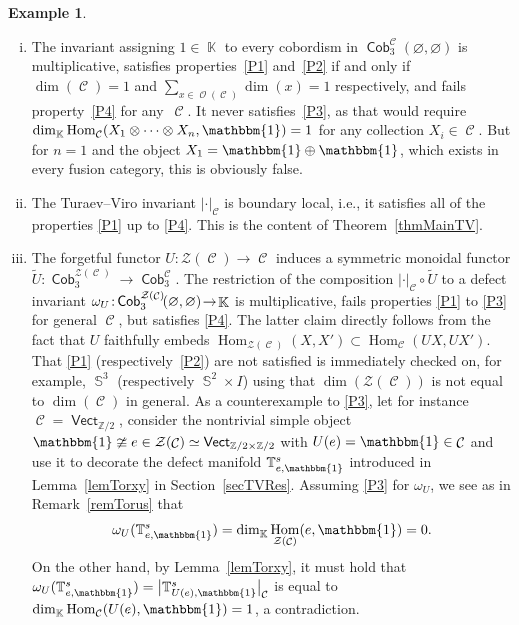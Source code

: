 \documentclass[10pt,a4paper]{amsart}
\DeclareMathOperator{\Hom}{Hom}
\DeclareMathOperator{\vect}{\mathsf{Vect}}
\DeclareMathOperator{\K}{\mathbb{K}}
\DeclareMathOperator{\Sp}{\mathbb{S}}
\DeclareMathOperator{\Cob}{\mathsf{Cob}}
\DeclareMathOperator{\calc}{\mathcal{C}}
\DeclareMathOperator{\calo}{\mathcal{O}}
\numberwithin{equation}{section}
\theoremstyle{definition}
\newtheorem{Example}[Example]{Example}
\begin{document}
\begin{Example}\label{exProp}\quad
 \begin{enumerate}[(i)]\itemsep=0pt
 \item The invariant assigning $1 \in \K$ to every cobordism in $\Cob_3^{\calc}(\varnothing, \varnothing)$ is multiplicative, satisfies properties~\ref{P1} and~\ref{P2} if and only if $\dim(\calc) = 1$ and $\sum_{x \in \calo(\calc)}\dim(x) = 1$ respectively, and fails property~\ref{P4} for any~$\calc$. It never satisfies~\ref{P3}, as that would require $\dim_{\K}\Hom_{\calc}(X_1 \otimes \dots \otimes X_n, \mathbbm{1}) = 1$ for any collection $X_i \in \calc$. But for $n = 1$ and the object $X_1 = \mathbbm{1} \oplus \mathbbm{1}$, which exists in every fusion category, this is obviously false.
 \item The Turaev--Viro invariant $| \cdot |_{\calc}$ is boundary local, i.e., it satisfies all of the properties \ref{P1} up to \ref{P4}. This is the content of Theorem~\ref{thmMainTV}.
 \item The forgetful functor $U\colon \mathcal{Z}(\calc) \rightarrow \calc$ induces a symmetric monoidal functor $\widetilde{U}\colon \Cob_3^{\mathcal{Z}(\calc)} \rightarrow \Cob_3^{\calc}$. The restriction of the composition $|\cdot|_{\calc} \circ {\widetilde{U}}$ to a defect invariant $\omega_U\colon\! {\smash{\Cob_3^{\mathcal{Z}(\calc)}\!(\varnothing, \varnothing)}\! \rightarrow\! \K}$ is multiplicative, fails properties \ref{P1} to \ref{P3} for general $\calc$, but satisfies \ref{P4}. The latter claim directly follows from the fact that $U$ faithfully embeds $\Hom_{\mathcal{Z}(\calc)}(X, X') \subset \Hom_{\calc}(UX, UX')$. That \ref{P1} (respectively~\ref{P2}) are not satisfied is immediately checked on, for example, $\Sp^3$ (respectively $\Sp^2 \times I$) using that $\dim(\mathcal{Z}(\calc))$ is not equal to $\dim(\calc)$ in general. As a counterexample to \ref{P3}, let for instance $\calc = \vect_{\mathbb{Z}/2}$, consider the nontrivial simple object $\mathbbm{1}\ncong e \in \mathcal{Z}(\calc) \simeq \vect_{\mathbb{Z}/2 \times \mathbb{Z}/2}$ with $U(e) = \mathbbm{1} \in \calc$ and use it to decorate the defect manifold $\mathbb{T}_{e, \mathbbm{1}}^s$ introduced in Lemma~\ref{lemTorxy} in Section~\ref{secTVRes}. Assuming \ref{P3} for $\omega_U$, we see as in Remark~\ref{remTorus} that
 \begin{align*}
 \omega_U (\mathbb{T}_{e, \mathbbm{1}}^s ) = \dim_{\K}\Hom_{\mathcal{Z}(\calc)}(e, \mathbbm{1}) = 0.
 \end{align*}
 On the other hand, by Lemma~\ref{lemTorxy}, it must hold that $\omega_U (\mathbb{T}_{e, \mathbbm{1}}^s ) = \bigl|\mathbb{T}_{U(e), \mathbbm{1}}^s\bigr|_{\calc}$ is equal to $\dim_{\K}\Hom_{\calc}(U(e), \mathbbm{1}) = 1$, a contradiction.

\end{enumerate}
\end{Example}
\end{document}
